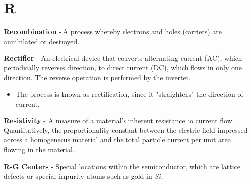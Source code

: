 \section{R}
    \textbf{Recombination} - A process whereby electrons and holes (carriers) are annihilated or destroyed.

\vspace{0.5cm}
\noindent
    \textbf{Rectifier} - An electrical device that converts alternating current (AC), which periodically reverses direction, to direct current (DC), which flows in only one direction. The reverse operation is performed by the inverter.
    \vspace{0.15cm}
    \begin{itemize}
        \setlength\itemsep{0.5em}
        \item{The process is known as rectification, since it "straightens" the direction of current.}
    \end{itemize}
\vspace{0.5cm}
    \textbf{Resistivity} - A measure of a material's inherent resistance to current flow.  Quantitatively, the proportionality constant between the electric field impressed across a homogeneous material and the total particle current per unit area flowing in the material.

\vspace{0.5cm}
\noindent
    \textbf{R-G Centers} - Special locations within the semiconductor, which are lattice defects or special impurity atoms such as gold in $Si$.

